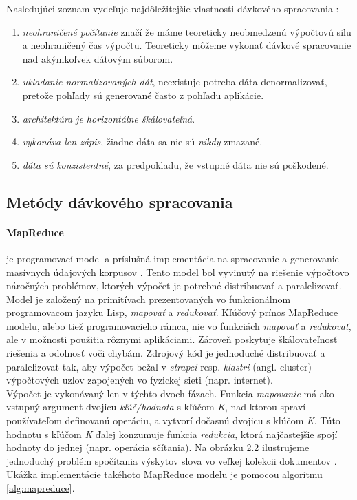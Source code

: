 Nasledujúci zoznam vydeľuje najdôležitejšie vlastnosti dávkového spracovania \citep{marz2013big}:
\begin{enumerate}
    \item \textit{neohraničené počítanie} značí že máme teoreticky neobmedzenú výpočtovú silu a neohraničený čas výpočtu. Teoreticky môžeme vykonať dávkové spracovanie nad akýmkoľvek dátovým súborom.
    \item \textit{ukladanie normalizovaných dát}, neexistuje potreba dáta denormalizovať, pretože pohľady sú generované často z pohľadu aplikácie.
    \item \textit{architektúra je horizontálne škálovateľná}.
    \item \textit{vykonáva len zápis}, žiadne dáta sa nie sú \textit{nikdy} zmazané.
    \item \textit{dáta sú konzistentné}, za predpokladu, že vstupné dáta nie sú poškodené.
\end{enumerate}

\subsection{Metódy dávkového spracovania}
\label{metody-davkove}
\paragraph{MapReduce} je programovací model a príslušná implementácia na spracovanie a generovanie masívnych údajových korpusov \citep{Dean2008}. 
Tento model bol vyvinutý na riešenie výpočtovo náročných problémov, ktorých výpočet je potrebné distribuovať a paralelizovať. 
Model je založený na primitívach prezentovaných vo funkcionálnom programovacom jazyku Lisp, \textit{mapovať} a \textit{redukovať}. Kľúčový prínos MapReduce modelu, alebo tiež programovacieho rámca, nie vo funkciách \textit{mapovať} a \textit{redukovať}, ale v možnosti použitia rôznymi aplikáciami. Zároveň poskytuje škálovateľnosť riešenia a odolnosť voči chybám. Zdrojový kód je jednoduché distribuovať a paralelizovať tak, aby výpočet bežal v \textit{strapci} resp. \textit{klastri} (angl. cluster) výpočtových uzlov zapojených vo fyzickej sieti (napr. internet). 
\\[5pt]
Výpočet je vykonávaný len v týchto dvoch fázach. Funkcia \textit{mapovanie} má ako vstupný argument dvojicu \textit{kľúč/hodnota} s kľúčom \textit{K}, nad ktorou spraví používateľom definovanú operáciu, a vytvorí dočasnú dvojicu s kľúčom \textit{K}. Túto hodnotu s kľúčom \textit{K} ďalej konzumuje funkcia \textit{redukcia}, ktorá najčastejšie spojí hodnoty do jednej (napr. operácia sčítania). Na obrázku 2.2 ilustrujeme jednoduchý problém spočítania výskytov slova vo veľkej kolekcii dokumentov \citep{Dean2008}. Ukážka implementácie takéhoto MapReduce modelu je pomocou algoritmu \ref{alg:mapreduce}.

